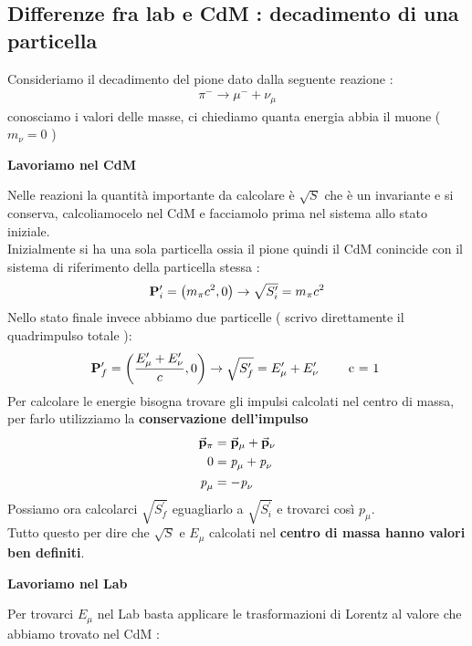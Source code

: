 \subsection{Differenze fra lab e CdM : decadimento di una particella}
Consideriamo il decadimento del pione dato dalla seguente reazione : 
\begin{align*}
    \pi^{-} \rightarrow \mu^{-} + \nu_{\mu}
\end{align*}
conosciamo i valori delle masse, ci chiediamo quanta energia abbia il muone ( $m_{\nu} = 0$ )
\begin{center}\textbf{Lavoriamo nel CdM}\end{center}
Nelle reazioni la quantità importante da calcolare è $\sqrt{S}$ che è un invariante e si conserva, calcoliamocelo nel CdM e 
facciamolo prima nel sistema allo stato iniziale.\\
Inizialmente si ha una sola particella ossia il pione quindi il CdM conincide con il sistema di riferimento della particella stessa : 
\begin{align*}
        \vb{P}^{\prime}_{i} = \qty(m_{\pi}c^2,0) \rightarrow \sqrt{S^{\prime}_{i}} = m_{\pi}c^2
\end{align*}
Nello stato finale invece abbiamo due particelle ( scrivo direttamente il quadrimpulso totale ): 
\begin{align*}
        \vb{P}^{\prime}_{f} = \qty(\frac{E^{\prime}_{\mu} + E^{\prime}_{\nu}}{c},0) \rightarrow \sqrt{S^{\prime}_{f}} = E^{\prime}_{\mu} + E^{\prime}_{\nu} \tag*{ c = 1 }
\end{align*}
Per calcolare le energie bisogna trovare gli impulsi calcolati nel centro di massa, per farlo utilizziamo la \textbf{ conservazione dell'impulso }
\begin{align*}
        \va{p}_{\pi} &= \va{p}_{\mu} + \va{p}_{\nu} \\
        0 &= \textit{p}_{\mu} + \textit{p}_{\nu}\\
        \textit{p}_{\mu} &= - \textit{p}_{\nu}
\end{align*}
Possiamo ora calcolarci $\sqrt{S^{\prime}_{f}}$ eguagliarlo a $\sqrt{S^{\prime}_{i}}$ e trovarci così $\textit{p}_{\mu}$. \\
Tutto questo per dire che $\sqrt{S}$ e $E_{\mu}$ calcolati nel \textbf{centro di massa hanno valori ben definiti}. \\
\begin{center}\textbf{Lavoriamo nel Lab}\end{center}
Per trovarci $E_{\mu}$ nel Lab basta applicare le trasformazioni di Lorentz al valore che abbiamo trovato nel CdM : 
